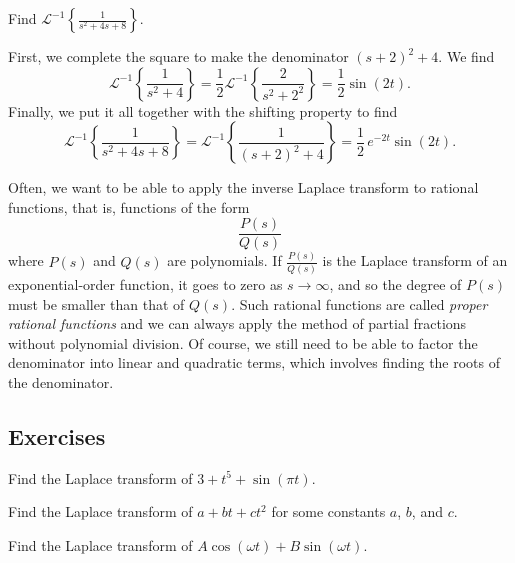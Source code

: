 \begin{example}
Find
${\mathcal{L}}^{-1} \left\{ \frac{1}{s^2+4s+8} \right\}$.

First, we complete the square to make the denominator ${(s+2)}^2+4$.  
We find
\begin{equation*}
{\mathcal{L}}^{-1} \left\{ \frac{1}{s^2+4} \right\}
=
\frac{1}{2}
{\mathcal{L}}^{-1} \left\{ \frac{2}{s^2+2^2} \right\}
=
\frac{1}{2} \sin (2t) .
\end{equation*}
Finally, we put it all together with the shifting property to find
\begin{equation*}
{\mathcal{L}}^{-1} \left\{ \frac{1}{s^2+4s+8} \right\} = 
{\mathcal{L}}^{-1} \left\{ \frac{1}{{(s+2)}^2+4} \right\}
=
\frac{1}{2}\,e^{-2t} \sin (2t) .
\end{equation*}
\end{example}

Often, we want to be able to apply the inverse Laplace transform to
rational functions, that is, functions of the form
\begin{equation*}
\frac{P(s)}{Q(s)}
\end{equation*}
where $P(s)$ and $Q(s)$ are polynomials.  If $\frac{P(s)}{Q(s)}$ is
the Laplace transform of an exponential-order function,
it goes to zero as $s \to \infty$, and so the degree of $P(s)$
must be smaller than that of $Q(s)$.  Such rational functions
are called \emph{proper rational functions}
and we can always apply the method of partial fractions without polynomial
division.
Of course, we still need to be able to factor the denominator into
linear and quadratic terms, which involves finding the roots of the
denominator.

\subsection{Exercises}

\begin{exercise}
Find the Laplace transform of $3+t^5+\sin (\pi t)$.
\end{exercise}

\begin{exercise}
Find the Laplace transform of $a+bt+ct^2$ for some constants $a$, $b$, and
$c$.
\end{exercise}

\begin{exercise}
Find the Laplace transform of $A \cos (\omega t) + B \sin (\omega t)$.
\end{exercise}

